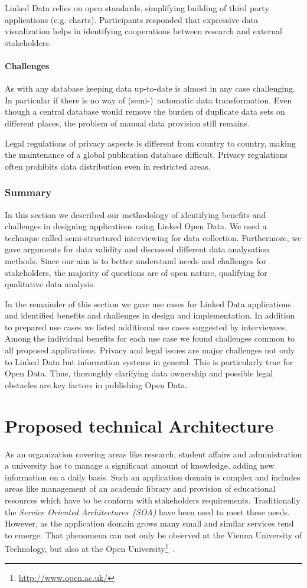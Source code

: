 \documentclass{article}
\begin{document}
Linked Data relies on open standards, simplifying building of third party applications (e.g. charts). Participants responded that expressive data visualization helps in identifying cooperations between research and external stakeholders.  
\paragraph{Challenges}
As with any database keeping data up-to-date is almost in any case challenging. In particular if there is no way of (semi-)~automatic data transformation. Even though a central database would remove the burden of duplicate data sets on different places, the problem of manual data provision still remains. 

Legal regulations of privacy aspects is different from country to country, making the maintenance of a global publication database difficult. Privacy regulations often prohibits data distribution even in restricted areas. 
\subsubsection{Summary}
In this section we described our methodology of identifying benefits and challenges in designing applications using Linked Open Data. We used a technique called semi-structured interviewing for data collection. Furthermore, we gave arguments for data validity and discussed different data analysation methods. Since our aim is to better understand needs and challenges for stakeholders, the majority of questions are of open nature, qualifying for qualitative data analysis. 

In the remainder of this section we gave use cases for Linked Data applications and identified benefits and challenges in design and implementation. In addition to prepared use cases we listed additional use cases suggested by interviewees. Among the individual benefits for each use case we found challenges common to all proposed applications. Privacy and legal issues are major challenges not only to Linked Data but information systems in general. This is particularly true for Open Data. Thus, thoroughly clarifying data ownership and possible legal obstacles are key factors in publishing Open Data. 

\section{Proposed technical Architecture}
As an organization covering areas like research, student affairs and administration a university has to manage a significant amount of knowledge, adding new information on a daily basis.
Such an application domain is complex and includes areas like management of an academic library and provision of educational resources which have to be conform with stakeholders requirements. Traditionally the \textit{Service Oriented Architectures~(SOA)} have been used to meet these needs. However, as the application domain grows many small and similar services tend to emerge. That phenomena can not only be observed at the Vienna University of Technology, but also at the Open University\footnote{\url{http://www.open.ac.uk/}}~\cite{inproceedings:zablith_consuming_2011}.
\end{document}
